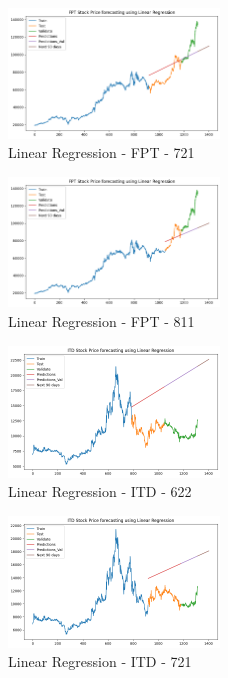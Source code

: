 \documentclass{ieeeojies}
\begin{document}
\begin{figure} [H]
    \centering
    \includegraphics[width=0.5\textwidth]{bibliography/Figure/LinearRegression_FPT_721_90.png}
    \caption{Linear Regression - FPT - 721}
    \label{fig:LR_FPT_721_90}
\end{figure}
\begin{figure} [H]
    \centering
    \includegraphics[width=0.5\textwidth]{bibliography/Figure/LinearRegression_FPT_811_90.png}
    \caption{Linear Regression - FPT - 811}
    \label{fig:LR_FPT_622_90}
\end{figure}
\begin{figure} [H]
    \centering
    \includegraphics[width=0.5\textwidth]{bibliography/Figure/LinearRegression_ITD_622_90.png}
    \caption{Linear Regression - ITD - 622}
    \label{fig:LR_ITD_622_90}
\end{figure}
\begin{figure} [H]
    \centering
    \includegraphics[width=0.5\textwidth]{bibliography/Figure/LinearRegression_ITD_721_90.png}
    \caption{Linear Regression - ITD - 721}
    \label{fig:LR_ITD_721_90}
\end{figure}
\end{document}
